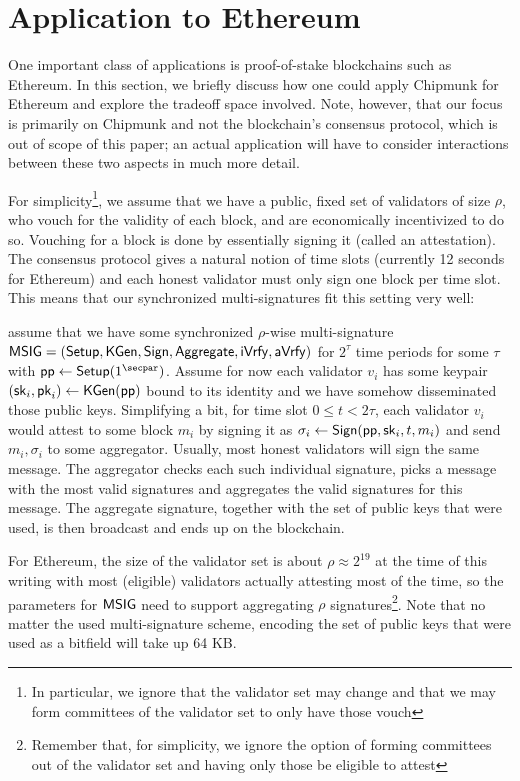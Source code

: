 \section{Application to Ethereum}\label{sec:ethereum}

One important class of applications is proof-of-stake blockchains such as Ethereum. %
In this section, we briefly discuss how one could apply Chipmunk for Ethereum and explore the tradeoff space involved.
Note, however, that our focus is primarily on Chipmunk and not the blockchain's consensus protocol, which is out of scope of this paper;
an actual application will have to consider interactions between these two aspects in much more detail.

For simplicity\footnote{In particular, we ignore that the validator set may change and that we may form committees of the validator set to only have those vouch}, we assume that we have a public, fixed set of validators of size $\rho$, who vouch for the validity of each block, and are economically incentivized to do so.
Vouching for a block is done by essentially signing it (called an attestation). The consensus protocol gives a natural notion of time slots (currently 12 seconds for Ethereum) and each honest validator must only sign one block per time slot. This means that our synchronized multi-signatures fit this setting very well:

assume that we have some synchronized $\rho$-wise multi-signature $\mathsf{MSIG} = (\mathsf{Setup}, \mathsf{KGen}, \mathsf{Sign}, \allowbreak \mathsf{Aggregate},\allowbreak \mathsf{iVrfy}, \mathsf{aVrfy})$ for $2^{\tau}$ time periods for some $\tau$ with $\params\gets\setup(1^{\secpar})$. Assume for now each validator $v_i$ has some keypair $(\mathsf{sk}_i,\mathsf{pk}_i)\gets \mathsf{KGen}(\mathsf{pp})$ bound to its identity and we have somehow disseminated those public keys.
Simplifying a bit, for time slot $0\leq t <2\tau$, each validator $v_i$ would attest to some block $m_i$ by signing it as $\sigma_i\gets\mathsf{Sign}(\mathsf{pp},\mathsf{sk}_i,t,m_i)$ and send $m_i, \sigma_i$ to some aggregator. Usually, most honest validators will sign the same message. The aggregator checks each such individual signature, picks a message with the most valid signatures and aggregates the valid signatures for this message. The aggregate signature, together with the set of public keys that were used, is then broadcast and ends up on the blockchain.

For Ethereum, the size of the validator set is about $\rho\approx 2^{19}$ at the time of this writing with most (eligible) validators actually attesting most of the time, so the parameters for $\mathsf{MSIG}$ need to support aggregating $\rho$ signatures\footnote{Remember that, for simplicity, we ignore the option of forming committees out of the validator set and having only those be eligible to attest}. Note that no matter the used multi-signature scheme, encoding the set of public keys that were used as a bitfield will take up 64 KB.

